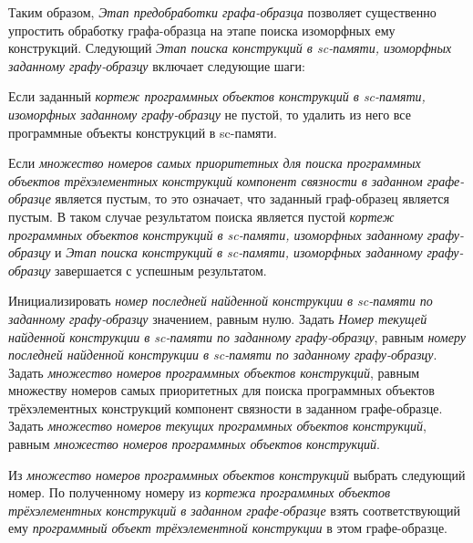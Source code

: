 Таким образом, \textit{Этап предобработки графа-образца} позволяет существенно упростить обработку графа-образца на этапе поиска изоморфных ему конструкций. Следующий \textit{Этап поиска конструкций в sc-памяти, изоморфных заданному графу-образцу} включает следующие шаги:
\begin{textitemize}
	\item Если заданный \textit{кортеж программных объектов конструкций в sc-памяти, изоморфных заданному графу-образцу} не пустой, то удалить из него все программные объекты конструкций в sc-памяти.
	\item Если \textit{множество номеров самых приоритетных для поиска программных объектов трёхэлементных конструкций компонент связности в заданном графе-образце} является пустым, то это означает, что заданный граф-образец является пустым. В таком случае результатом поиска является пустой \textit{кортеж программных объектов конструкций в sc-памяти, изоморфных заданному графу-образцу} и \textit{Этап поиска конструкций в sc-памяти, изоморфных заданному графу-образцу} завершается с успешным результатом.
	\item Инициализировать \textit{номер последней найденной конструкции в sc-памяти по заданному графу-образцу} значением, равным нулю. Задать \textit{Номер текущей найденной конструкции в sc-памяти по заданному графу-образцу}, равным \textit{номеру последней найденной конструкции в sc-памяти по заданному графу-образцу}. Задать \textit{множество номеров  программных объектов конструкций}, равным {множеству номеров самых приоритетных для поиска программных объектов трёхэлементных конструкций компонент связности в заданном графе-образце}. Задать \textit{множество номеров текущих программных объектов конструкций}, равным \textit{множество номеров  программных объектов конструкций}.
	\item Из \textit{множество номеров  программных объектов конструкций} выбрать следующий номер. По полученному номеру из \textit{кортежа программных объектов трёхэлементных конструкций в заданном графе-образце} взять соответствующий ему \textit{программный объект трёхэлементной конструкции} в этом графе-образце.

\end{textitemize}
